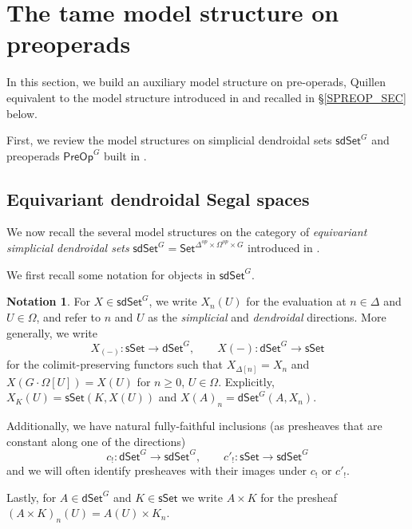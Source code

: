 \documentclass[a4paper,10pt
,draft
]{article}%
\numberwithin{equation}{section}
\numberwithin{figure}{section}
\theoremstyle{definition} %
\newtheorem{notation}[equation]{Notation}%
\newcommand{\longto}{\longrightarrow}%
\newcommand{\Set}{\ensuremath{\mathsf{Set}}}
\newcommand{\sSet}{\ensuremath{\mathsf{sSet}}}%
\newcommand{\dSet}{\mathsf{dSet}}
\newcommand{\1}{\ensuremath{\mathbbm 1}}%
\begin{document}
\section{The tame model structure on preoperads}
\label{TAME_SEC}


{\color{orange}
  In this section, we build an auxiliary model structure on pre-operads,
  Quillen equivalent to the model structure introduced in \cite{BP_edss} and recalled in \S \ref{SPREOP_SEC} below.
}

First, we review the model structures on
simplicial dendroidal sets $\mathsf{sdSet}^G$
and preoperads $\mathsf{PreOp}^G$ built in \cite{BP_edss}.


\subsection{Equivariant dendroidal Segal spaces}
\label{JT_SEC}


We now recall the several model structures on the category of
\textit{equivariant simplicial dendroidal sets}
$\mathsf{sdSet}^G = \Set^{\Delta^{op} \times \Omega^{op} \times G}$
introduced in \cite{BP_edss}.

We first recall some notation for objects in $\mathsf{sdSet}^G$.

\begin{notation}
      For $X \in \mathsf{sdSet}^G$, we write $X_n(U)$ for the evaluation at $n \in \Delta$ and $U \in \Omega$,
      and refer to $n$ and $U$ as the \textit{simplicial} and \textit{dendroidal} directions.
      More generally, we write
      \begin{equation}
            \label{SDSET_EQ}
            X_{(-)} \colon \sSet \to \dSet^G,
            \qquad
            X(-) \colon \dSet^G \to \sSet
      \end{equation}
      for the colimit-preserving functors
      such that $X_{\Delta[n]} = X_n$ and 
      $X\left(G \cdot\Omega[U]\right) = X(U)$ for $n \geq 0$, $U \in \Omega$.
      Explicitly, $X_K(U) = \sSet(K, X(U))$ and $X(A)_n = \dSet^G(A, X_n)$.
      
	Additionally, we have natural fully-faithful inclusions
	(as presheaves that are constant along one of the directions)
\[
	c_{!} \colon \dSet^G \longto \mathsf{sdSet}^G,
		\qquad
	c'_! \colon \sSet \longto \mathsf{sdSet}^G
\]
	and we will often identify presheaves with their images under $c_!$ or $c'_!$.

	Lastly, for $A \in \dSet^G$ and $K \in \sSet$ we write $A \times K$ for the presheaf $(A \times K)_n(U) = A(U) \times K_n$.
\end{notation}
\end{document}
